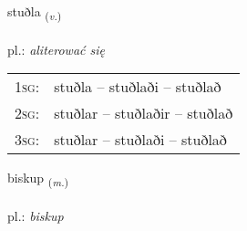 \documentclass[frontgrid, backgrid]{flacards}\usepackage[]{graphicx}\usepackage[]{xcolor}
\begin{document}
\renewcommand{\flhead}{\vskip5pt \fboxsep=0pt {\small\bfseries\footnotesize Sagnorð | Verb}}
\renewcommand{\fcfoot}{\vskip5pt \fboxsep=0pt \hspace{2pt}{\small\bfseries\footnotesize 1K}}

\renewcommand{\blhead}{\vskip5pt {\small\bfseries\footnotesize Sagnorð | Verb }}
\renewcommand{\bcfoot}{\vskip5pt \hspace{2pt}{\small\bfseries\footnotesize 1K}}


{stuðla \small{\textsubscript{(\textit{v.})}} \\[1ex] %
\textphonetic{[stʏðla]} \\
pl.: \emph{aliterować się} \\  [2ex]
\renewcommand*{\arraystretch}{0.8}
\begin{tabular}{p{1cm}l}
\textsc{1sg}: & stuðla -- stuðlaði -- stuðlað \\ 
\textsc{2sg}: & stuðlar -- stuðlaðir -- stuðlað \\ 
\textsc{3sg}: & stuðlar -- stuðlaði -- stuðlað \\ 
\end{tabular}
}

\renewcommand{\flhead}{\vskip5pt \fboxsep=0pt {\small\bfseries\footnotesize Nafnorð | Noun}}
\renewcommand{\fcfoot}{\vskip5pt \fboxsep=0pt \hspace{2pt}{\small\bfseries\footnotesize 1K}}

\renewcommand{\blhead}{\vskip5pt {\small\bfseries\footnotesize Nafnorð | Noun }}
\renewcommand{\bcfoot}{\vskip5pt \hspace{2pt}{\small\bfseries\footnotesize 1K}}


{biskup \small{\textsubscript{(\textit{m.})}} \\[1ex] %
\textphonetic{[pɪskʏp]} \\
pl.: \emph{biskup} \\  [2ex]
\renewcommand*{\arraystretch}{0.8}
}
\end{document}
